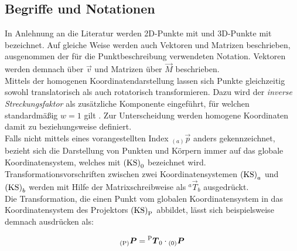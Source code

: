 \subsection{Begriffe und Notationen}
In Anlehnung an die Literatur \cite{Zhang2000} werden 2D-Punkte mit  und 3D-Punkte mit  bezeichnet. Auf gleiche Weise werden auch Vektoren und Matrizen beschrieben, ausgenommen der für die Punktbeschreibung verwendeten Notation. Vektoren werden demnach über $\vec{v}$ und Matrizen über $\vec{M}$ beschrieben.\\
Mittels der homogenen Koordinatendarstellung lassen sich Punkte gleichzeitig sowohl translatorisch als auch rotatorisch transformieren. Dazu wird der \textit{inverse Streckungsfaktor} als zusätzliche Komponente eingeführt, für welchen standardmäßig $w=1$ gilt \cite{Nischwitz20111}. Zur Unterscheidung werden homogene Koordinaten damit zu  beziehungsweise  definiert.\\
Falls nicht mittels eines vorangestellten Index $_{(a)}\vec{p}$ anders gekennzeichnet, bezieht sich die Darstellung von Punkten und Körpern immer auf das globale Koordinatensystem, welches mit ${\mathrm{(KS)}}_{\mathrm{0}}$ bezeichnet wird. Transformationsvorschriften zwischen zwei Koordinatensystemen ${\mathrm{(KS)}}_a$ und ${\mathrm{(KS)}}_b$ werden mit Hilfe der Matrixschreibweise als ${^{a}\vec{T}_{b}}$ ausgedrückt.\\
Die Transformation, die einen Punkt vom globalen Koordinatensystem in das Koordinatensystem des Projektors ${\mathrm{(KS)}}_{\mathrm{P}}$ abbildet, lässt sich beispielsweise demnach ausdrücken als:

\begin{equation}
{_{{\mathrm{(P)}}}}\mbox{\boldmath{$P$}} = {^{\mathrm{P}}\mbox{\boldmath{$T$}}_{\mathrm{0}}}\cdot{_{{\mathrm{(0)}}}}\mbox{\boldmath{$P$}}
\end{equation}



